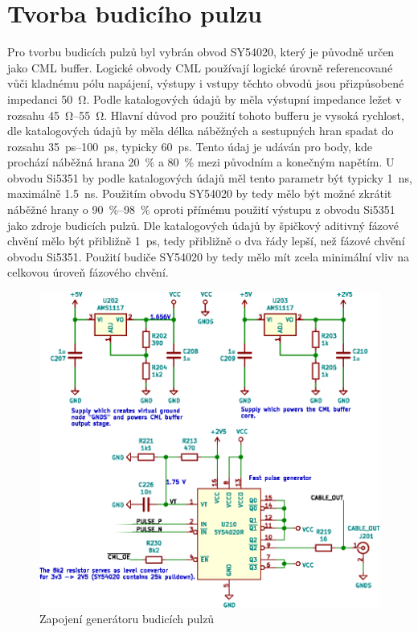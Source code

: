 \section{Tvorba budicího pulzu}
Pro tvorbu budicích pulzů byl vybrán obvod SY54020, který je původně určen jako \acrshort{CML} buffer. Logické obvody \acrshort{CML} používají logické úrovně referencované vůči kladnému pólu napájení, výstupy i vstupy těchto obvodů jsou přizpůsobené impedanci \SI{50}{\ohm}. Podle katalogových údajů \cite{SY54020datasheet} by měla výstupní impedance ležet v rozsahu \SIrange{45}{55}{\ohm}. Hlavní důvod pro použití tohoto bufferu je vysoká rychlost, dle katalogových údajů by měla délka náběžných a sestupných hran spadat do rozsahu \SIrange{35}{100}{\pico\second}, typicky \SI{60}{ps}. Tento údaj je udáván pro body, kde prochází náběžná hrana \SI{20}{\%} a \SI{80}{\%} mezi původním a konečným napětím. U obvodu Si5351 by podle katalogových údajů měl tento parametr být typicky \SI{1}{\nano\second}, maximálně \SI{1.5}{\nano\second}. Použitím obvodu SY54020 by tedy mělo být možné zkrátit náběžné hrany o \SIrange{90}{98}{\%} oproti přímému použití výstupu z obvodu Si5351 jako zdroje budicích pulzů. Dle katalogových údajů by špičkový aditivný fázové chvění mělo být přibližně \SI{1}{\pico\second}, tedy přibližně o dva řády lepší, než fázové chvění obvodu Si5351. Použití budiče SY54020 by tedy mělo mít zcela minimální vliv na celkovou úroveň fázového chvění.

\begin{figure}[htbp]
\includegraphics[width=\textwidth,keepaspectratio]{images/pulse_generator_section.eps}\caption{Zapojení generátoru budicích pulzů}\label{pulse_generator_section_schematic}
\end{figure}	

